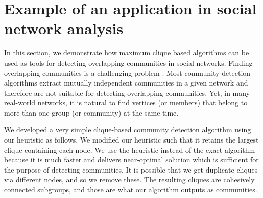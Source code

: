 \section{Example of an application in social network analysis}
\label{sec:applications}

In this section, we demonstrate how maximum clique based algorithms can be used as  tools for  
detecting overlapping communities in social networks. 
Finding overlapping communities is a challenging problem \cite{Fortunato_2010}. 
Most community detection algorithms extract mutually independent communities 
in a given network and therefore are not suitable for detecting overlapping communities.
Yet, in many real-world networks, it is natural to find vertices (or members) that belong to more than 
one group (or community) at the same time.

We developed a very simple clique-based community detection algorithm using our heuristic as follows. We modified our heuristic such that it retains the largest clique containing each node. We use the heuristic instead of the exact algorithm because it is much faster and delivers near-optimal solution which is sufficient for the purpose of detecting communities. It is possible that we get duplicate cliques via different nodes,  
and so we remove these. The resulting cliques are cohesively connected subgroups, and those are
what our algorithm outputs as communities.






